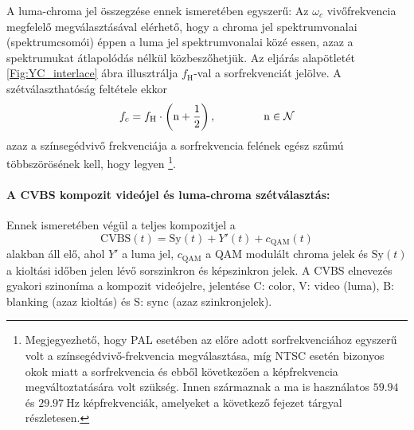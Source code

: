 A luma-chroma jel összegzése ennek ismeretében egyszerű: 
Az $\omega_c$ vivőfrekvencia megfelelő megválasztásával elérhető, hogy a chroma jel spektrumvonalai (spektrumcsomói) éppen a luma jel spektrumvonalai közé essen, azaz a spektrumukat átlapolódás nélkül közbeszőhetjük.
Az eljárás alapötletét \ref{Fig:YC_interlace} ábra illusztrálja $f_{\mathrm{H}}$-val a sorfrekvenciát jelölve.
A szétválaszthatóság feltétele ekkor 
\begin{equation}
f_c = f_{\mathrm{H}} \cdot \left( \mathrm{n} + \frac{1}{2}\right), \hspace{1.5cm} \mathrm{n} \in \mathcal{N} 
\end{equation}
azaz a színsegédvivő frekvenciája a sorfrekvencia felének egész szűmú többszörösének kell, hogy legyen \footnote{Megjegyezhető, hogy PAL esetében az előre adott sorfrekvenciához egyszerű volt a színsegédvivő-frekvencia megválasztása, míg NTSC esetén bizonyos okok miatt a sorfrekvencia és ebből következően a képfrekvencia megváltoztatására volt szükség. 
Innen származnak a ma is használatos $59.94$ és $29.97~\mathrm{Hz}$ képfrekvenciák, amelyeket a következő fejezet tárgyal részletesen.}.

\paragraph{A CVBS kompozit videójel és luma-chroma szétválasztás:}
Ennek ismeretében végül a teljes kompozitjel a 
\begin{equation}
\text{CVBS}(t) = \mathrm{Sy}(t) + Y'(t) + c_{\mathrm{QAM}}(t)
\end{equation}
alakban áll elő, ahol $Y'$ a luma jel, $c_{\mathrm{QAM}}$ a QAM modulált chroma jelek és $\mathrm{S\!y}(t)$ a kioltási időben jelen lévő sorszinkron és képszinkron jelek.
A CVBS elnevezés gyakori szinoníma a kompozit videójelre, jelentése C: color, V: video (luma), B: blanking (azaz kioltás) és S: sync (azaz szinkronjelek).

